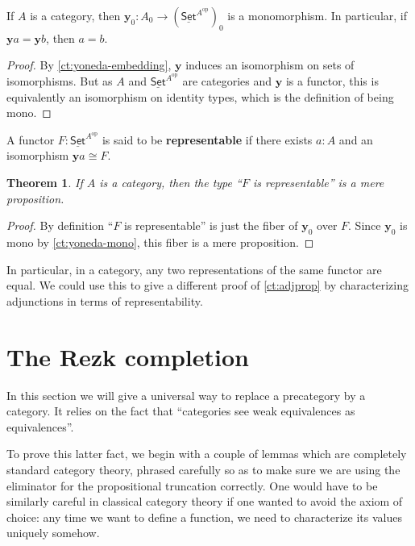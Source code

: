 \documentclass{mscs}
\renewcommand{\set}{\ensuremath{\mathsf{Set}}\xspace}
\newcommand{\uset}{\ensuremath{\underline{\set}}\xspace}
\newtheorem{thm}{Theorem}[section]
\numberwithin{equation}{section}
\newcommand{\op}{^{\textrm{op}}}
\newcommand{\y}{\ensuremath{\mathbf{y}}\xspace}
\begin{document}
\begin{cor}\label{ct:yoneda-mono}
  If $A$ is a category, then $\y_0 : A_0 \to (\uset^{A\op})_0$ is a monomorphism.
  In particular, if $\y a = \y b$, then $a=b$.
\end{cor}
\begin{proof}
  By \autoref{ct:yoneda-embedding}, \y induces an isomorphism on sets of isomorphisms.
  But as $A$ and $\uset^{A\op}$ are categories and \y is a functor, this is equivalently an isomorphism on identity types, which is the definition of being mono.
\end{proof}

\begin{defn}\label{ct:representable}
  A functor $F:\uset^{A\op}$ is said to be \textbf{representable} if there exists $a:A$ and an isomorphism $\y a \cong F$.
\end{defn}

\begin{thm}\label{ct:representable-prop}
  If $A$ is a category, then the type ``$F$ is representable'' is a mere proposition.
\end{thm}
\begin{proof}
  By definition ``$F$ is representable'' is just the fiber of $\y_0$ over $F$.
  Since $\y_0$ is mono by \autoref{ct:yoneda-mono}, this fiber is a mere proposition.
\end{proof}

In particular, in a category, any two representations of the same functor are equal.
We could use this to give a different proof of \autoref{ct:adjprop} by characterizing adjunctions in terms of representability.


\section{The Rezk completion}
\label{sec:rezk}

In this section we will give a universal way to replace a precategory by a category.
It relies on the fact that ``categories see weak equivalences as equivalences''.

To prove this latter fact, we begin with a couple of lemmas which are completely standard category theory, phrased carefully so as to make sure we are using the eliminator for the propositional truncation correctly.
One would have to be similarly careful in classical category theory if one wanted to avoid the axiom of choice: any time we want to define a function, we need to characterize its values uniquely somehow.
\end{document}
